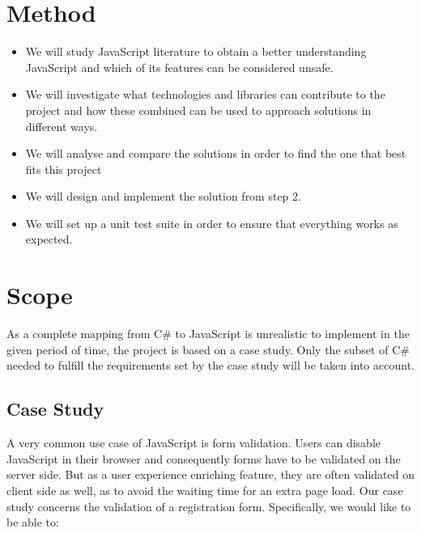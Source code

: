 \section{Method}
	\begin{itemize}
	\item We will study JavaScript literature to obtain a better understanding JavaScript and which of its features can be considered unsafe. 
	\item We will investigate what technologies and libraries can contribute to the project and how these combined can be used to approach solutions in different ways.
	\item We will analyse and compare the solutions in order to find the one that best fits this project
	\item We will design and implement the solution from step 2.
	\item We will set up a unit test suite in order to ensure that everything works as expected.
	\end{itemize}

\section{Scope}
	As a complete mapping from C\# to JavaScript is unrealistic to implement in the given period of time, the project is based on a case study. Only the subset of C\# needed to fulfill the requirements set by the case study will be taken into account.

	\subsection{Case Study}
		A very common use case of JavaScript is form validation. Users can disable JavaScript in their browser and consequently forms have to be validated on the server side. But as a user experience enriching feature, they are often validated on client side as well, as to avoid the waiting time for an extra page load. Our case study concerns the validation of a registration form. Specifically, we would like to be able to:

